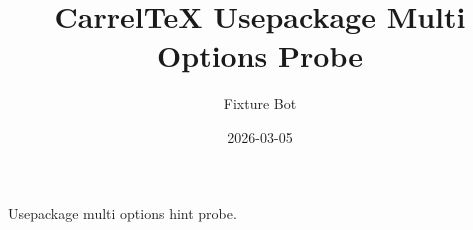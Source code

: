 \documentclass{article}
\title{CarrelTeX Usepackage Multi Options Probe}
\author{Fixture Bot}
\date{2026-03-05}
\begin{document}
\maketitle

Usepackage multi options hint probe.
\end{document}
